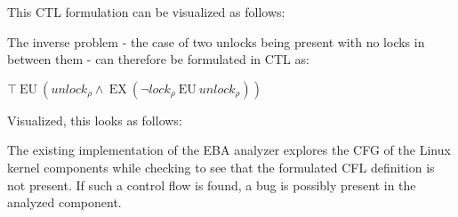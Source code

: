 \noindent This CTL formulation can be visualized as follows: 


\noindent The inverse problem - the case of two unlocks being present with no locks in between them - can therefore be formulated in CTL as: 

\begin{center}
    $\top\:\mathrm{EU}\:\left({u n l o c k}_{\rho} \wedge\:\mathrm{EX}\:\left(\neg {l o c k}_{\rho}\:\mathrm{EU}\:{u n l o c k}_{\rho}\right)\right)$
\end{center}

\noindent Visualized, this looks as follows:


\noindent The existing implementation of the EBA analyzer explores the CFG of the Linux kernel components while checking to see that the formulated CFL definition is not present. If such a control flow is found, a bug is possibly present in the analyzed component. 

